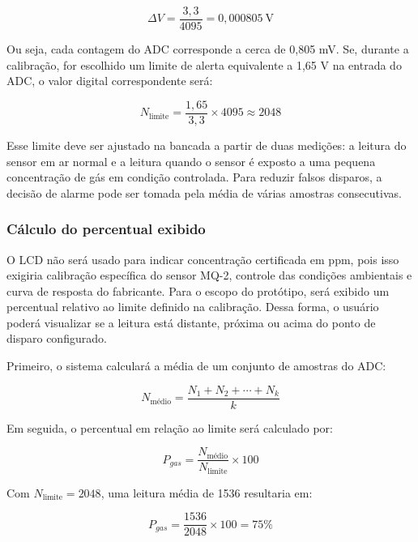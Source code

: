 \documentclass[11pt,a4paper]{article}
\numberwithin{equation}{section}
\begin{document}
\begin{equation}
  \Delta V = \frac{3{,}3}{4095} = 0{,}000805\ \text{V}
  \label{eq:resolucao}
\end{equation}

Ou seja, cada contagem do ADC corresponde a cerca de 0,805 mV. Se, durante a calibração, for escolhido
um limite de alerta equivalente a 1,65 V na entrada do ADC, o valor digital correspondente será:

\begin{equation}
  N_{\text{limite}} = \frac{1{,}65}{3{,}3} \times 4095 \approx 2048
  \label{eq:nlimite}
\end{equation}

Esse limite deve ser ajustado na bancada a partir de duas medições: a leitura do sensor em ar normal e
a leitura quando o sensor é exposto a uma pequena concentração de gás em condição controlada. Para
reduzir falsos disparos, a decisão de alarme pode ser tomada pela média de várias amostras
consecutivas.

\subsubsection{Cálculo do percentual exibido}

O LCD não será usado para indicar concentração certificada em ppm, pois isso exigiria calibração
específica do sensor MQ-2, controle das condições ambientais e curva de resposta do fabricante. Para o
escopo do protótipo, será exibido um percentual relativo ao limite definido na calibração. Dessa
forma, o usuário poderá visualizar se a leitura está distante, próxima ou acima do ponto de disparo
configurado.

Primeiro, o sistema calculará a média de um conjunto de amostras do ADC:

\begin{equation}
  N_{\text{médio}} = \frac{N_1 + N_2 + \cdots + N_k}{k}
  \label{eq:media}
\end{equation}

Em seguida, o percentual em relação ao limite será calculado por:

\begin{equation}
  P_{gas} = \frac{N_{\text{médio}}}{N_{\text{limite}}} \times 100
  \label{eq:percentual}
\end{equation}

Com $N_{\text{limite}} = 2048$, uma leitura média de 1536 resultaria em:

\begin{equation}
  P_{gas} = \frac{1536}{2048} \times 100 = 75\%
  \label{eq:p75}
\end{equation}
\end{document}
